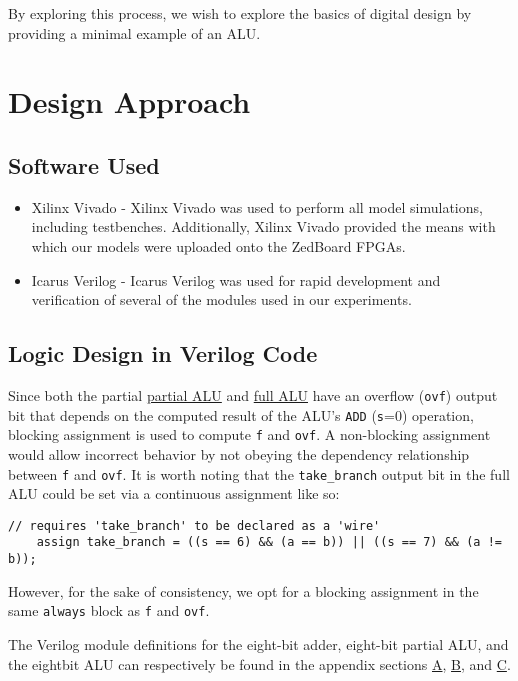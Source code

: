 \documentclass[12pt, letterpaper]{article}
\begin{document}
By exploring this process, we wish to explore the basics of digital design by providing a minimal example of an ALU.  

\newpage
\section{Design Approach}

\subsection{Software Used}
\begin{itemize}
	\item Xilinx Vivado - Xilinx Vivado was used to perform all model simulations, including testbenches.  Additionally, Xilinx Vivado provided the means with which our models were uploaded onto the ZedBoard FPGAs.
	\item Icarus Verilog - Icarus Verilog was used for rapid development and verification of several of the modules used in our experiments.
\end{itemize}

\subsection{Logic Design in Verilog Code}
Since both the partial \href{eightbit_partial_alu_module}{partial ALU} and \href{eightbit_alu_module}{full ALU} have an overflow (\texttt{ovf}) output bit that depends on the computed result of the ALU's \texttt{ADD} (\texttt{s}=0) operation, blocking assignment is used to compute \texttt{f} and \texttt{ovf}.  A non-blocking assignment would allow incorrect behavior by not obeying the dependency relationship between \texttt{f} and \texttt{ovf}.  It is worth noting that the \texttt{take\_branch} output bit in the full ALU could be set via a continuous assignment like so:
\begin{lstlisting}[style=verilog-style]
	// requires 'take_branch' to be declared as a 'wire'
	assign take_branch = ((s == 6) && (a == b)) || ((s == 7) && (a != b));
\end{lstlisting}
However, for the sake of consistency, we opt for a blocking assignment in the same \texttt{always} block as \texttt{f} and \texttt{ovf}.

The Verilog module definitions for the eight-bit adder, eight-bit partial ALU, and the eightbit ALU can respectively be found in the appendix sections \href{eightbit_adder_module}{A}, \href{eightbit_partial_alu_module}{B}, and \href{eightbit_alu_module}{C}.
\end{document}
